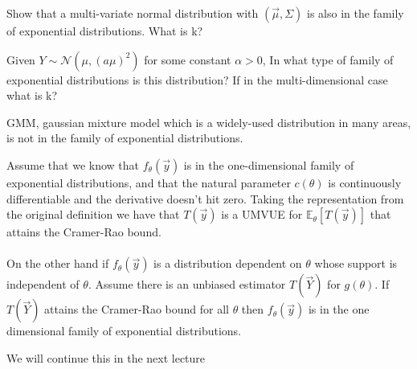 \documentclass[../main.tex]{subfiles}
\begin{document}
\begin{exercise}
Show that a multi-variate normal distribution with $(\overrightarrow{\mu},\Sigma)$ is also in the family of exponential distributions. What is k?
\end{exercise}
\begin{exercise}
Given $Y\sim\mathcal{N}(\mu, (a\mu)^2)$ for some constant $\alpha>0$, In what type of family of exponential distributions is this distribution? If in the multi-dimensional case what is k? 
\end{exercise}
GMM, gaussian mixture model which is a widely-used distribution in many areas, is not in the family of exponential distributions. 
\begin{theorem}
Assume that we know that $f_{\theta}(\overrightarrow{y})$ is in the one-dimensional family of exponential distributions, and that the natural parameter $c(\theta)$ is continuously differentiable and the derivative doesn't hit zero. Taking the representation from the original definition we have that $T(\overrightarrow{y})$ is a UMVUE for $\mathbb{E}_\theta[T(\overrightarrow{y})]$  that attains the Cramer-Rao bound. \\\\
On the other hand if $f_\theta(\overrightarrow{y})$ is a distribution dependent on $\theta$ whose support is independent of $\theta$. Assume there is an unbiased estimator $T(\overrightarrow{Y})$ for $g(\theta)$. If $T(\overrightarrow{Y})$ attains the Cramer-Rao bound for all $\theta$ then $f_\theta(\overrightarrow{y})$ is in the one dimensional family of exponential distributions. 
\end{theorem}
We will continue this in the next lecture
\end{document}
